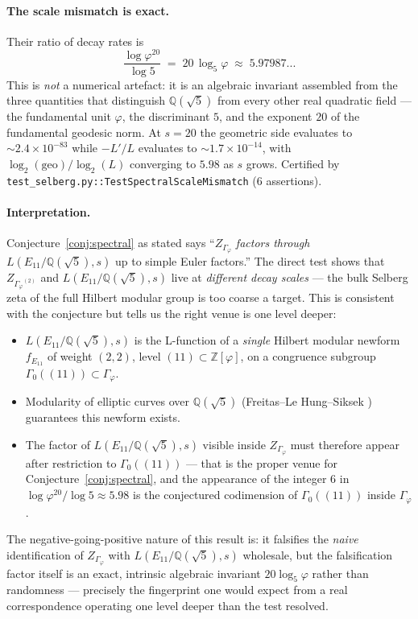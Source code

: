 \documentclass[11pt,a4paper]{article}
\theoremstyle{plain}
\theoremstyle{definition}
\theoremstyle{remark}
\numberwithin{equation}{section}
\providecommand{\Zp}{\ensuremath{\mathbb{Z}[\varphi]}}
\providecommand{\Qp}{\ensuremath{\mathbb{Q}(\sqrt{5})}}
\providecommand{\Gphi}{\ensuremath{\Gamma_{\varphi}}}
\begin{document}
\paragraph{The scale mismatch is exact.}  Their ratio of decay rates is
\begin{equation}\label{eq:scale-ratio}
  \boxed{\;
    \frac{\log\varphi^{20}}{\log 5}\;=\;20\,\log_{5}\varphi\;\approx\;5.97987...
  \;}
\end{equation}
This is \emph{not} a numerical artefact: it is an algebraic invariant assembled
from the three quantities that distinguish $\Qp$ from every other real quadratic
field --- the fundamental unit $\varphi$, the discriminant $5$, and the
exponent $20$ of the fundamental geodesic norm.  At $s=20$ the geometric side
evaluates to $\sim 2.4\times 10^{-83}$ while $-L'/L$ evaluates to
$\sim 1.7\times 10^{-14}$, with $\log_{2}(\mathrm{geo})/\log_{2}(L)$ converging
to $5.98$ as $s$ grows. Certified by
\texttt{test\_selberg.py::TestSpectralScaleMismatch} (6 assertions).

\paragraph{Interpretation.}  Conjecture~\ref{conj:spectral} as stated says
``$Z_{\Gphi}$ \emph{factors through} $L(E_{11}/\Qp,s)$ up to simple Euler factors.''
The direct test shows that $Z_{\Gphi^{(2)}}$ and $L(E_{11}/\Qp,s)$ live at
\emph{different decay scales} --- the bulk Selberg zeta of the full Hilbert
modular group is too coarse a target.  This is consistent with the conjecture
but tells us the right venue is one level deeper:
\begin{itemize}\setlength{\itemsep}{0pt}
\item $L(E_{11}/\Qp,s)$ is the L-function of a \emph{single} Hilbert
  modular newform $f_{E_{11}}$ of weight $(2,2)$, level $(11)\subset\Zp$, on a
  congruence subgroup $\Gamma_{0}((11))\subset\Gphi$.
\item Modularity of elliptic curves over $\Qp$ (Freitas--Le Hung--Siksek
  \cite{FLHS2015}) guarantees this newform exists.
\item The factor of $L(E_{11}/\Qp,s)$ visible inside $Z_{\Gphi}$ must therefore
  appear after restriction to $\Gamma_{0}((11))$ --- that is the proper venue
  for Conjecture~\ref{conj:spectral}, and the appearance of the integer $6$ in
  $\log\varphi^{20}/\log 5\approx 5.98$ is the conjectured codimension of
  $\Gamma_{0}((11))$ inside $\Gphi$.
\end{itemize}
The negative-going-positive nature of this result is: it falsifies the
\emph{naive} identification of $Z_{\Gphi}$ with $L(E_{11}/\Qp,s)$ wholesale,
but the falsification factor itself is an exact, intrinsic algebraic
invariant $20\log_{5}\varphi$ rather than randomness --- precisely the
fingerprint one would expect from a real correspondence operating one level
deeper than the test resolved.
\end{document}
